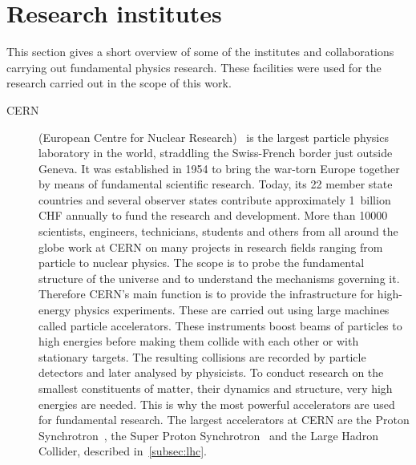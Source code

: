 \section{Research institutes}
This section gives a short overview of some of the institutes and collaborations carrying out fundamental physics research. These facilities were used for the research carried out in the scope of this work. 


\begin{description}
\item[CERN] (European Centre for Nuclear Research)~\cite{CERN:00000} is the largest particle physics laboratory in the world, straddling the Swiss-French border just outside Geneva. It was established in 1954 to bring the war-torn Europe together by means of fundamental scientific research. Today, its 22 member state countries and several observer states contribute approximately 1~billion CHF annually to fund the research and development. More than 10000 scientists, engineers, technicians, students and others from all around the globe work at CERN on many projects in research fields ranging from particle to nuclear physics. The scope is to probe the fundamental structure of the universe and to understand the mechanisms governing it. Therefore CERN's main function is to provide the infrastructure for high-energy physics experiments. These are carried out using large machines called particle accelerators. These instruments boost beams of particles to high energies before making them collide with each other or with stationary targets. The resulting collisions are recorded by particle detectors and later analysed by physicists. To conduct research on the smallest constituents of matter, their dynamics and structure, very high energies are needed. This is why the most powerful accelerators are used for fundamental research. The largest accelerators at CERN are the Proton Synchrotron~\cite{Regenstreif:342915}, the Super Proton Synchrotron~\cite{Mills:133232} and the Large Hadron Collider, described in~\ref{subsec:lhc}.




\end{description}

